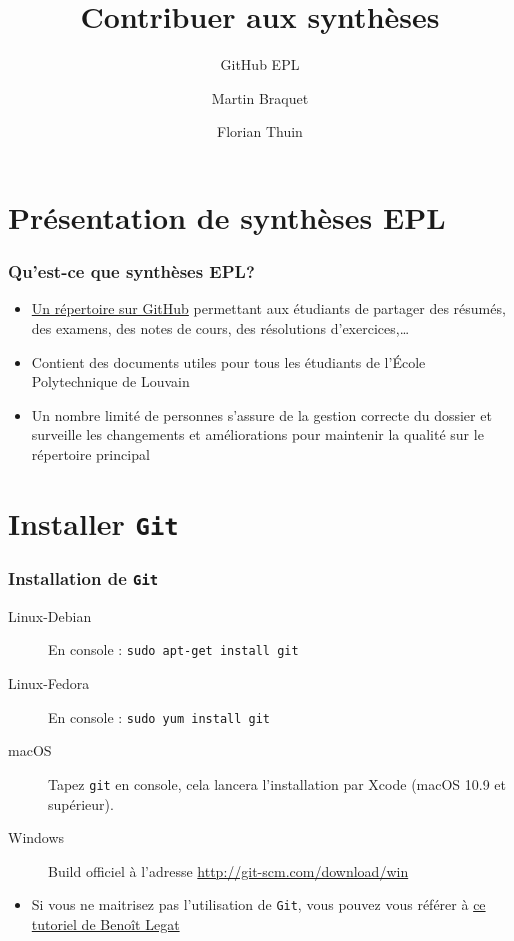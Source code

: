 \documentclass{beamer}
\title{Contribuer aux synthèses}
\subtitle{GitHub EPL}
\author{Martin Braquet \and Florian Thuin}
\institute{École Polytechnique de Louvain}
\begin{document}
\begin{frame}[plain]
	\titlepage
\end{frame}



\section{Présentation de synthèses EPL}

\begin{frame}
	\frametitle{Qu'est-ce que synthèses EPL?}
		\begin{itemize}
 			\item \href{https://github.com/Gp2mv3/Syntheses}{Un répertoire sur GitHub} permettant aux étudiants de
 			    partager des résumés, des examens, des notes de cours,
 			    des résolutions d'exercices,\ldots
 			\item Contient des documents utiles pour tous les étudiants
 			    de l'École Polytechnique de Louvain
 			\item Un nombre limité de personnes s'assure de la gestion
 			    correcte du dossier et surveille les changements et
 			    améliorations pour maintenir la qualité sur le répertoire
 			    principal
 		\end{itemize}
\end{frame}

\section{Installer \texttt{Git}}

\begin{frame}[fragile]
    \frametitle{Installation de \lstinline|Git|}
    \begin{description}
        \item[Linux-Debian] En console : \lstinline|sudo apt-get install git|
        \item[Linux-Fedora] En console : \lstinline|sudo yum install git|
        \item[macOS] Tapez \lstinline|git| en console, cela lancera
            l'installation par Xcode (macOS 10.9 et supérieur).
        \item[Windows] Build officiel à l'adresse
            \url{http://git-scm.com/download/win}
    \end{description}
    \begin{itemize}
        \item Si vous ne maitrisez pas l'utilisation de \lstinline|Git|, vous pouvez
            vous référer à
            \href{http://sites.uclouvain.be/SystInfo/notes/Outils/html/git.html}{ce
            tutoriel de Benoît Legat}
    \end{itemize}
\end{frame}
\end{document}
